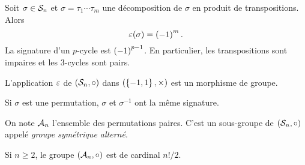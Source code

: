 \documentclass{magnolia}
\begin{document}
\begin{remarques}
\remarque Soit $\sigma\in\mathcal{S}_{n}$ et $\sigma=\tau_1\cdots\tau_{m}$ une
  décomposition de $\sigma$ en produit de transpositions. Alors
  \[\signat{\sigma}=\p{-1}^m.\]
\remarque La signature d'un $p$-cycle est $\left(-1\right)^{p-1}$. En particulier, les
  transpositions sont impaires et les 3-cycles sont pairs.
\end{remarques}


\begin{proposition}
L'application $\signature$ de $\left(\mathcal{S}_{n},\circ\right)$ dans $\left(\left\{-1,1\right\},\times\right)$
est un morphisme de groupe.
\end{proposition}

\begin{remarqueUnique}
\remarque Si $\sigma$ est une permutation, $\sigma$ et $\sigma^{-1}$ ont la même
  signature.  
\end{remarqueUnique}


\begin{definition}
On note $\mathcal{A}_{n}$ l'ensemble des permutations paires. C'est un sous-groupe de
$(\mathcal{S}_{n},\circ)$ appelé \emph{groupe symétrique alterné}.
\end{definition}

\begin{remarqueUnique}
\remarque Si $n\geq 2$, le groupe $\left(\mathcal{A}_{n},\circ\right)$ est de cardinal $n!/2$.
\end{remarqueUnique}
\end{document}

